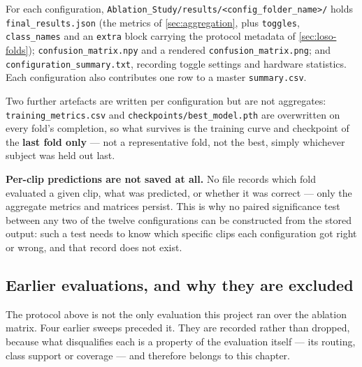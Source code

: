 For each configuration, \texttt{Ablation\_Study/results/<config\_folder\_name>/} holds \texttt{final\_results.json} (the metrics of \autoref{sec:aggregation}, plus \texttt{toggles}, \texttt{class\_names} and an \texttt{extra} block carrying the protocol metadata of \autoref{sec:loso-folds}); \texttt{confusion\_matrix.npy} and a rendered \texttt{confusion\_matrix.png}; and \texttt{configuration\_summary.txt}, recording toggle settings and hardware statistics. Each configuration also contributes one row to a master \texttt{summary.csv}.

Two further artefacts are written per configuration but are not aggregates: \texttt{training\_metrics.csv} and \texttt{checkpoints/best\_model.pth} are overwritten on every fold's completion, so what survives is the training curve and checkpoint of the \textbf{last fold only} --- not a representative fold, not the best, simply whichever subject was held out last.

\textbf{Per-clip predictions are not saved at all.} No file records which fold evaluated a given clip, what was predicted, or whether it was correct --- only the aggregate metrics and matrices persist. This is why no paired significance test between any two of the twelve configurations can be constructed from the stored output: such a test needs to know which specific clips each configuration got right or wrong, and that record does not exist.

\subsection{Earlier evaluations, and why they are excluded}
\label{sec:excluded-evaluations}

The protocol above is not the only evaluation this project ran over the ablation matrix. Four earlier sweeps preceded it. They are recorded rather than dropped, because what disqualifies each is a property of the evaluation itself --- its routing, class support or coverage --- and therefore belongs to this chapter.

